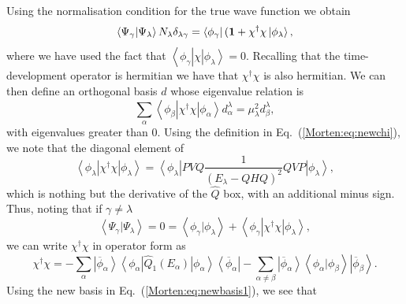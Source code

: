 Using the normalisation condition for the true wave function
we obtain
\begin{equation}
  \left\langle \Psi_{\gamma} |\Psi_{\lambda}\right\rangle
  N_{\lambda}\delta_{\lambda\gamma}=
  \left\langle \phi_{\gamma}\right |({\bf 1} +
   \chi^{\dagger}\chi\left | \phi_{\lambda}\right\rangle,
  \label{Morten:eq:newnorm}
\end{equation}
where we have used the fact that
$\left\langle \phi_{\gamma}\right | 
\chi\left | \phi_{\lambda}\right\rangle=0$. Recalling that the
time-development operator is hermitian we have that $\chi^{\dagger}\chi$ is
also hermitian. We can then define an orthogonal basis $d$ whose eigenvalue
relation is
\begin{equation}
   \sum_{\alpha}\left\langle \phi_{\beta}\right | \chi^{\dagger}
   \chi\left | \phi_{\alpha}
   \right\rangle d_{\alpha}^{\lambda}=\mu^{2}_{\lambda}
   d_{\beta}^{\lambda},
   \label{Morten:eq:newbasis1}
\end{equation}
with eigenvalues greater than $0$.
Using the definition in Eq.~(\ref{Morten:eq:newchi}), we note
that the diagonal element of
\begin{equation}
   \left\langle \phi_{\lambda}\right | \chi^{\dagger}
   \chi\left | \phi_{\lambda}\right\rangle=
   \left\langle \phi_{\lambda}\right | PVQ\frac{1}{(E_{\lambda}-QHQ)^2}QVP
   \left | \phi_{\lambda}\right\rangle,
   \label{Morten:eq:chichi}
\end{equation}
which is nothing but the derivative of the $\hat{Q}$ box, with an additional
minus sign. Thus, noting that if $\gamma\neq\lambda$
\begin{equation}
  \left\langle \Psi_{\gamma} |\Psi_{\lambda}\right\rangle=0=
    \left\langle \phi_{\gamma} |\phi_{\lambda}\right\rangle
   +\left\langle \phi_{\gamma}\right |
    \chi^{\dagger}\chi\left | \phi_{\lambda}\right\rangle,
\end{equation}
we can write $\chi^{\dagger}\chi$
in operator form as
\begin{equation}
   \chi^{\dagger}\chi =-\sum_{\alpha}\left | 
    \overline{\phi}_{\alpha}\right\rangle
   \left\langle \phi_{\alpha}\right | 
    \hat{Q}_1(E_{\alpha})\left | \phi_{\alpha}\right\rangle
   \left\langle \overline{\phi}_{\alpha} \right |
   -\sum_{\alpha\neq\beta}\left | \overline{\phi}_{\alpha}\right\rangle
    \left\langle \phi_{\alpha} |\phi_{\beta}\right\rangle
   \left | \overline{\phi}_{\beta}\right\rangle.
\end{equation}
Using the new basis in Eq.~(\ref{Morten:eq:newbasis1}), we see that
